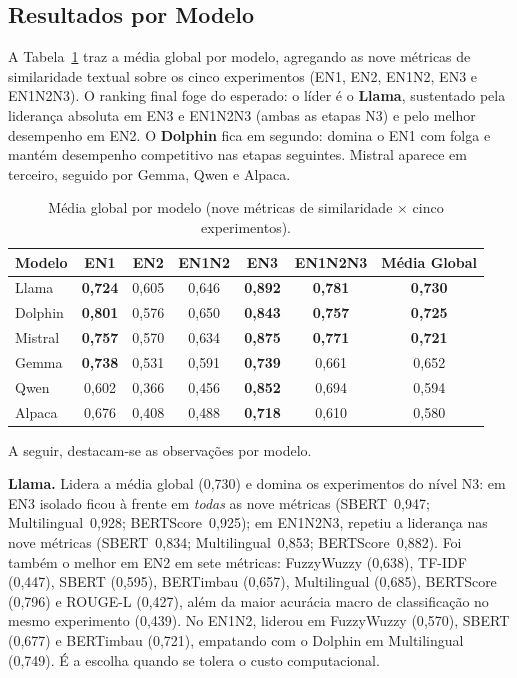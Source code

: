\documentclass[a4paper,fleqn]{cas-sc}
\newcommand{\melhor}[1]{\textcolor{green!55!black}{#1}}
\newcommand{\pior}[1]{\textcolor{red!80!black}{#1}}
\begin{document}
\subsection{Resultados por Modelo}

A Tabela~\ref{tab:ranking_global} traz a média global por modelo, agregando as nove métricas de similaridade textual sobre os cinco experimentos (EN1, EN2, EN1N2, EN3 e EN1N2N3). O ranking final foge do esperado: o líder é o \textbf{Llama}, sustentado pela liderança absoluta em EN3 e EN1N2N3 (ambas as etapas N3) e pelo melhor desempenho em EN2. O \textbf{Dolphin} fica em segundo: domina o EN1 com folga e mantém desempenho competitivo nas etapas seguintes. Mistral aparece em terceiro, seguido por Gemma, Qwen e Alpaca.

\begin{table}[ht]
\centering
\caption{Média global por modelo (nove métricas de similaridade $\times$ cinco experimentos).}
\label{tab:ranking_global}
\small
\begin{tabular}{lcccccc}
\hline
Modelo  & EN1   & EN2   & EN1N2 & EN3   & EN1N2N3 & Média Global \\
\hline
Llama   & \textbf{0{,}724} & \melhor{0{,}605} & 0{,}646 & \melhor{\textbf{0{,}892}} & \melhor{\textbf{0{,}781}} & \melhor{\textbf{0{,}730}} \\
Dolphin & \melhor{\textbf{0{,}801}} & 0{,}576 & \melhor{0{,}650} & \textbf{0{,}843} & \textbf{0{,}757} & \textbf{0{,}725} \\
Mistral & \textbf{0{,}757} & 0{,}570 & 0{,}634 & \textbf{0{,}875} & \textbf{0{,}771} & \textbf{0{,}721} \\
Gemma   & \textbf{0{,}738} & 0{,}531 & 0{,}591 & \textbf{0{,}739} & 0{,}661 & 0{,}652 \\
Qwen    & \pior{0{,}602} & \pior{0{,}366} & \pior{0{,}456} & \textbf{0{,}852} & 0{,}694 & 0{,}594 \\
Alpaca  & 0{,}676 & 0{,}408 & 0{,}488 & \pior{\textbf{0{,}718}} & \pior{0{,}610} & \pior{0{,}580} \\
\hline
\end{tabular}
\end{table}

A seguir, destacam-se as observações por modelo.

\textbf{Llama.} Lidera a média global (0{,}730) e domina os experimentos do nível N3: em EN3 isolado ficou à frente em \textit{todas} as nove métricas (SBERT~0{,}947; Multilingual~0{,}928; BERTScore~0{,}925); em EN1N2N3, repetiu a liderança nas nove métricas (SBERT~0{,}834; Multilingual~0{,}853; BERTScore~0{,}882). Foi também o melhor em EN2 em sete métricas: FuzzyWuzzy (0{,}638), TF-IDF (0{,}447), SBERT (0{,}595), BERTimbau (0{,}657), Multilingual (0{,}685), BERTScore (0{,}796) e ROUGE-L (0{,}427), além da maior acurácia macro de classificação no mesmo experimento (0{,}439). No EN1N2, liderou em FuzzyWuzzy (0{,}570), SBERT (0{,}677) e BERTimbau (0{,}721), empatando com o Dolphin em Multilingual (0{,}749). É a escolha quando se tolera o custo computacional.
\end{document}
